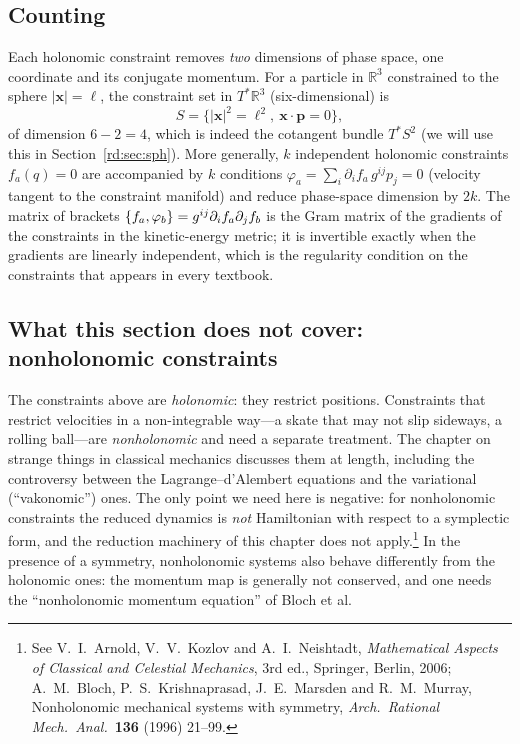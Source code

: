 \subsection{Counting}\label{rd:sec:count}

Each holonomic constraint removes \emph{two} dimensions of phase space, one coordinate and its conjugate momentum. For a particle in $\mathbb R^3$ constrained to the sphere $|\mathbf x|=\ell$, the constraint set in $T^*\mathbb R^3$ (six-dimensional) is
\begin{equation}\label{rd:Ssph}
S=\{|\mathbf x|^2=\ell^2,\ \mathbf x\cdot\mathbf p=0\},
\end{equation}
of dimension $6-2=4$, which is indeed the cotangent bundle $T^*S^2$ (we will use this in Section~\ref{rd:sec:sph}). More generally, $k$ independent holonomic constraints $f_a(q)=0$ are accompanied by $k$ conditions $\varphi_a=\sum_i\partial_if_a\,g^{ij}p_j=0$ (velocity tangent to the constraint manifold) and reduce phase-space dimension by $2k$. The matrix of brackets $\{f_a,\varphi_b\}=g^{ij}\partial_if_a\partial_jf_b$ is the Gram matrix of the gradients of the constraints in the kinetic-energy metric; it is invertible exactly when the gradients are linearly independent, which is the regularity condition on the constraints that appears in every textbook.

\subsection{What this section does not cover: nonholonomic constraints}\label{rd:sec:nonhol}

The constraints above are \emph{holonomic}: they restrict positions. Constraints that restrict velocities in a non-integrable way---a skate that may not slip sideways, a rolling ball---are \emph{nonholonomic} and need a separate treatment. The chapter on strange things in classical mechanics discusses them at length, including the controversy between the Lagrange--d'Alembert equations and the variational (``vakonomic'') ones. The only point we need here is negative: for nonholonomic constraints the reduced dynamics is \emph{not} Hamiltonian with respect to a symplectic form, and the reduction machinery of this chapter does not apply.\footnote{See V.\ I.\ Arnold, V.\ V.\ Kozlov and A.\ I.\ Neishtadt, \emph{Mathematical Aspects of Classical and Celestial Mechanics}, 3rd ed., Springer, Berlin, 2006; A.\ M.\ Bloch, P.\ S.\ Krishnaprasad, J.\ E.\ Marsden and R.\ M.\ Murray, Nonholonomic mechanical systems with symmetry, \emph{Arch.\ Rational Mech.\ Anal.}\ \textbf{136} (1996) 21--99.} In the presence of a symmetry, nonholonomic systems also behave differently from the holonomic ones: the momentum map is generally not conserved, and one needs the ``nonholonomic momentum equation'' of Bloch et al.


